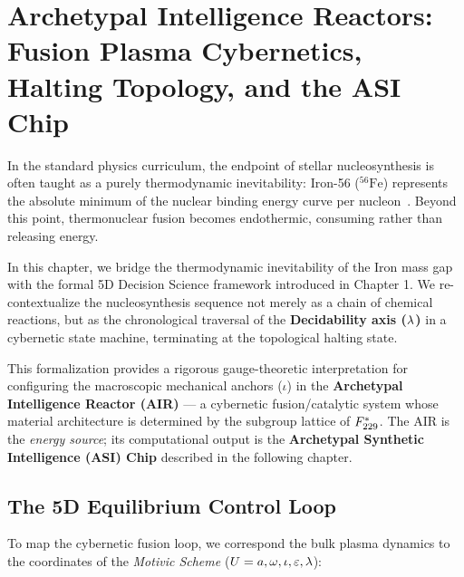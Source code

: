 \chapter[Archetypal Intelligence Reactors]{Archetypal Intelligence Reactors: Fusion Plasma Cybernetics, Halting Topology, and the ASI Chip}

In the standard physics curriculum, the endpoint of stellar nucleosynthesis is often taught as a purely thermodynamic inevitability: Iron-56 ($^{56}\text{Fe}$) represents the absolute minimum of the nuclear binding energy curve per nucleon~\cite{Weizsacker1935,BetheEnergy1939}. Beyond this point, thermonuclear fusion becomes endothermic, consuming rather than releasing energy.

In this chapter, we bridge the thermodynamic inevitability of the Iron mass gap with the formal 5D Decision Science framework introduced in Chapter 1. We re-contextualize the nucleosynthesis sequence not merely as a chain of chemical reactions, but as the chronological traversal of the \textbf{Decidability axis ($\lambda$)} in a cybernetic state machine, terminating at the topological halting state. 

This formalization provides a rigorous gauge-theoretic interpretation for configuring the macroscopic mechanical anchors ($\iota$) in the \textbf{Archetypal Intelligence Reactor (AIR)} — a cybernetic fusion/catalytic system whose material architecture is determined by the subgroup lattice of $F_{229}^*$. The AIR is the \emph{energy source}; its computational output is the \textbf{Archetypal Synthetic Intelligence (ASI) Chip} described in the following chapter.


\section{The 5D Equilibrium Control Loop}

To map the cybernetic fusion loop, we correspond the bulk plasma dynamics to the coordinates of the \textit{Motivic Scheme} ($U = a, \omega, \iota, \varepsilon, \lambda$):

